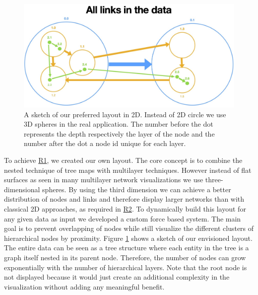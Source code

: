 \begin{figure}[h]
    \centering
    \includegraphics[width=\textwidth, trim={0cm 0cm 0cm 3.5cm},clip]{graphics/filterLinks/allLinks.jpg}
    \caption[A sketch of our preferred layout in 2D.]{A sketch of our preferred layout in 2D. Instead of 2D circle we use 3D spheres in the real application. The number before the dot represents the depth respectively the layer of the node and the number after the dot a node id unique for each layer.} 
    \label{fig:layoutSketch} 
\end{figure}
To achieve \hyperref[req:R1]{R1}, we created our own layout. The core concept is to combine the nested technique of tree maps with multilayer techniques. However instead of flat surfaces as seen in many multilayer network visualizations we use three-dimensional spheres. 
By using the third dimension we can achieve a better distribution of nodes and links and therefore display larger networks than with classical 2D approaches, as required in \hyperref[req:R2]{R2}. 
To dynamically build this layout for any given data as input we developed a custom force based system.
The main goal is to prevent overlapping of nodes while still visualize the different clusters of hierarchical nodes by proximity. Figure \ref{fig:layoutSketch} shows a sketch of our envisioned layout. The entire data can be seen as a tree structure where each entity in the tree is a graph itself nested in its parent node. Therefore, the number of nodes can grow exponentially with the number of hierarchical layers. Note that the root node is not displayed because it would just create an additional complexity in the visualization without adding any meaningful benefit.

